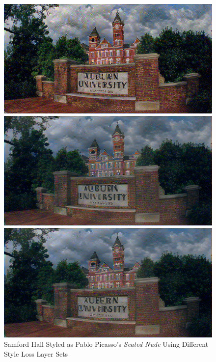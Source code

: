 \documentclass{article}
\begin{document}
\begin{figure}[htp]
\centering
\caption{Samford Hall Styled as Pablo Picasso's \textit{Seated Nude} Using
Different Style Loss Layer Sets}
\label{fig:style-layers-effect}

    \begin{minipage}{0.3\linewidth}
    \includegraphics[width=\textwidth]{img/style-layer-selection/block1_conv1}
    \end{minipage}
    \begin{minipage}{0.3\linewidth}
    \includegraphics[width=\textwidth]{img/style-layer-selection/block2_conv1}
    \end{minipage}
    \begin{minipage}{0.3\linewidth}
    \includegraphics[width=\textwidth]{img/style-layer-selection/block3_conv1}
    \end{minipage}


\end{figure}
\end{document}
